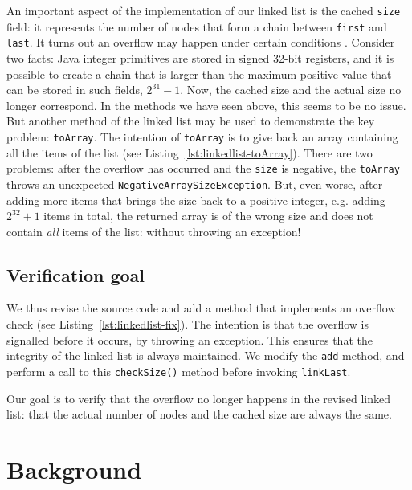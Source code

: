 \documentclass[runningheads]{llncs}
\begin{document}
An important aspect of the implementation of our linked list is the cached \texttt{size} field: it represents the number of nodes that form a chain between \texttt{first} and \texttt{last}. It turns out an overflow may happen under certain conditions \cite{hiep2019verifying}. Consider two facts: Java integer primitives are stored in signed 32-bit registers, and it is possible to create a chain that is larger than the maximum positive value that can be stored in such fields, $2^{31}-1$. Now, the cached size and the actual size no longer correspond. In the methods we have seen above, this seems to be no issue. But another method of the linked list may be used to demonstrate the key problem: \texttt{toArray}. The intention of \texttt{toArray} is to give back an array containing all the items of the list (see Listing~\ref{lst:linkedlist-toArray}). There are two problems: after the overflow has occurred and the \texttt{size} is negative, the \texttt{toArray} throws an unexpected \texttt{NegativeArraySizeException}. But, even worse, after adding more items that brings the size back to a positive integer, e.g. adding $2^{32}+1$ items in total, the returned array is of the wrong size and does not contain \emph{all} items of the list: without throwing an exception!



\subsection{Verification goal}

We thus revise the source code and add a method that implements an overflow check (see Listing~\ref{lst:linkedlist-fix}). The intention is that the overflow is signalled before it occurs, by throwing an exception. This ensures that the integrity of the linked list is always maintained. We modify the \texttt{add} method, and perform a call to this \texttt{checkSize()} method before invoking \texttt{linkLast}.



Our goal is to verify that the overflow no longer happens in the revised linked list: that the actual number of nodes and the cached size are always the same.

\section{Background}\label{sec:background}
\end{document}
